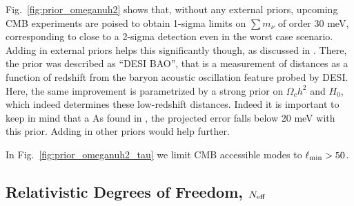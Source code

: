 \documentclass[aps,prd,reprint,superscriptaddress]{revtex4-1}
\newcommand{\reffig}[1]{Fig.~\ref{fig:#1}}
\begin{document}
\reffig{prior_omeganuh2} shows that, without any external priors, upcoming CMB experiments are poised to obtain 1-sigma limits on $\sum m_\nu$ of order 30 meV, corresponding to close to a 2-sigma detection even in the worst case scenario. Adding in external priors helps this significantly though, as discussed in \cite{2013arXiv1309.5383A,pan:2015,allison:2015}. 
There, the prior was described as ``DESI BAO'', that is a measurement of distances as a function of redshift from the baryon acoustic oscillation feature probed by DESI. Here, the same improvement is parametrized by a strong prior on $\Omega_ch^2$ and $H_{0}$, which indeed determines these low-redshift distances. 
Indeed it is important to keep in mind that a 
As found in \cite{2013arXiv1309.5383A}, the projected error falls below 20 meV with this prior. Adding in other priors would help further.

In \reffig{prior_omeganuh2_tau} we limit CMB accessible modes to $\ell_{\rm min}>50$.


\subsection{Relativistic Degrees of Freedom, $N_{\rm eff}$}
\end{document}

